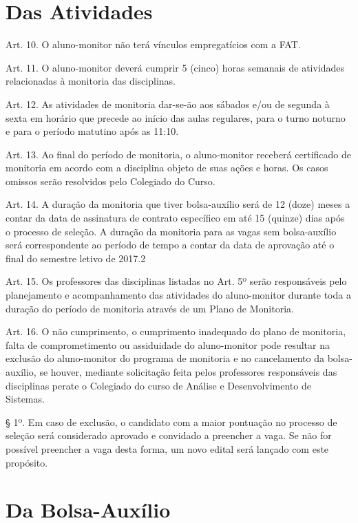 \documentclass[10pt, oneside]{memoir}
\begin{document}
\section*{Das Atividades}
\setlength{\parindent}{0em}
\setlength{\parskip}{0.2cm}
{\raggedright
	Art. 10. O aluno-monitor não terá vínculos empregatícios com a FAT.
	
	Art. 11. O aluno-monitor deverá cumprir 5 (cinco) horas semanais de atividades relacionadas à monitoria das disciplinas.
	
	Art. 12. As atividades de monitoria dar-se-ão aos sábados e/ou de segunda à sexta em horário que precede ao início das aulas regulares, para o turno noturno e para o período matutino após as 11:10.
	
	Art. 13. Ao final do período de monitoria, o aluno-monitor receberá certificado de monitoria em acordo com a disciplina objeto de suas ações e horas. Os casos omissos serão resolvidos pelo Colegiado do Curso.
	
	Art. 14. A duração da monitoria que tiver bolsa-auxílio será de 12 (doze) meses a contar da data de assinatura de contrato específico em até 15 (quinze) dias após o processo de seleção. A duração da monitoria para as vagas sem bolsa-auxílio será correspondente ao período de tempo a contar da data de aprovação até o final do semestre letivo de 2017.2
	
	Art. 15. Os professores das disciplinas listadas no Art. 5º serão responsáveis pelo planejamento e acompanhamento das atividades do aluno-monitor durante toda a duração do período de monitoria através de um Plano de Monitoria.
	
	Art. 16. O não cumprimento, o cumprimento inadequado do plano de monitoria, falta de comprometimento ou assiduidade do aluno-monitor pode resultar na exclusão do aluno-monitor do programa de monitoria e no cancelamento da bolsa-auxílio, se houver, mediante solicitação feita pelos professores responsáveis das disciplinas perate o Colegiado do curso de Análise e Desenvolvimento de Sistemas.
	
	§ 1º. Em caso de exclusão, o candidato com a maior pontuação no processo de seleção será considerado aprovado e convidado a preencher a vaga. Se não for possível preencher a vaga desta forma, um novo edital será lançado com este propósito.
	
	\section*{Da Bolsa-Auxílio}
	
}
\end{document}
